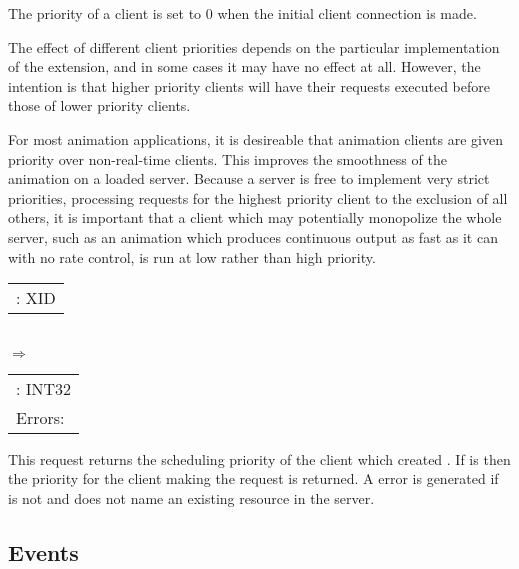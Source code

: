 \begin{description}
The priority of a client is set to 0 when the initial client connection is
made.

The effect of different client priorities depends on the particular
implementation of the extension, and in some cases it may have no effect at
all. However, the intention is that higher priority clients will have their
requests executed before those of lower priority clients.

For most animation applications, it is desireable that animation clients are
given priority over non-real-time clients. This improves the smoothness of the
animation on a loaded server. Because a server is free to implement very strict
priorities, processing requests for the highest priority client to the
exclusion of all others, it is important that a client which may potentially
monopolize the whole server, such as an animation which produces continuous
output as fast as it can with no rate control, is run at low rather than high
priority.


\begin{tabular}{l}
	\param{client-resource}: XID\\
\end{tabular}\\
$\Rightarrow$\\
\begin{tabular}{l}
	\param{priority}: INT32\\[5pt]
	Errors: \error{Match}
\end{tabular}

This request returns the scheduling priority of the client which created
. If  is  then the
priority for the client making the request is returned. A  error
is generated if  is not  and does not name
an existing resource in the server.

\end{description}

\subsection*{Events}

